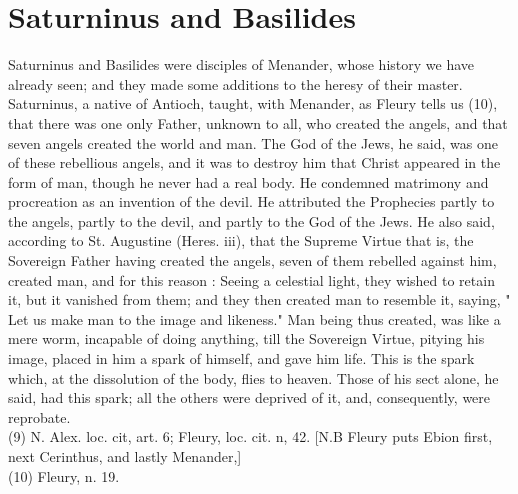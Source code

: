 \documentclass[12pt]{book}
\begin{document}
\section{Saturninus and Basilides}
Saturninus and Basilides were disciples of Menander, whose history we have already seen; and they
made some additions to the heresy of their master. Saturninus, a native of Antioch, taught, with
Menander, as Fleury tells us (10), that there was one only Father, unknown to all, who created the angels,
and that seven angels created the world and man. The God of the Jews, he said, was one of these
rebellious angels, and it was to destroy him that Christ appeared in the form of man, though he never
had a real body. He condemned matrimony and procreation as an invention of the devil. He attributed
the Prophecies partly to the angels, partly to the devil, and partly to the God of the Jews. He also said,
according to St. Augustine (Heres. iii), that the Supreme Virtue that is, the Sovereign Father having
created the angels, seven of them rebelled against him, created man, and for this reason : Seeing a celestial
light, they wished to retain it, but it vanished from them; and they then created man to resemble it,
saying, " Let us make man to the image and likeness." Man being thus created, was like a mere worm,
incapable of doing anything, till the Sovereign Virtue, pitying his image, placed in him a spark of himself,
and gave him life. This is the spark which, at the dissolution of the body, flies to heaven. Those of his sect
alone, he said, had this spark; all the others were deprived of it, and, consequently, were reprobate.\\
(9) N. Alex. loc. cit, art. 6; Fleury, loc. cit. n, 42. [N.B Fleury puts Ebion first, next Cerinthus, and lastly
Menander,]\\
(10) Fleury, n. 19.
\end{document}
